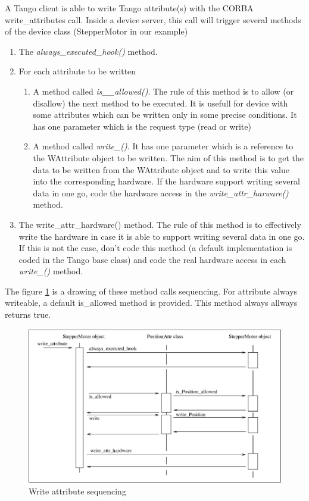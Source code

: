 A Tango client is able to write Tango attribute(s) with the CORBA
write\_attributes call. Inside a device server,
this call will trigger several methods of the device class (StepperMotor
in our example)
\begin{enumerate}
\item The \emph{always\_executed\_hook()}
method. 
\item For each attribute to be written

\begin{enumerate}
\item A method called \emph{is\_<att name>\_allowed()}. The rule of this
method is to allow (or disallow) the next method to be executed. It
is usefull for device with some attributes which can be written only
in some precise conditions. It has one parameter which is the request
type (read or write)
\item A method called \emph{write\_<att name>()}. It has one parameter which
is a reference to the WAttribute object to be written. The aim of
this method is to get the data to be written from the WAttribute object
and to write this value into the corresponding hardware. If the hardware
support writing several data in one go, code the hardware access in
the \emph{write\_attr\_harware()} method.
\end{enumerate}
\item The write\_attr\_hardware() method. The
rule of this method is to effectively write the hardware in case it
is able to support writing several data in one go. If this is not
the case, don't code this method (a default implementation is coded
in the Tango base class) and code the real hardware access in each
\emph{write\_<att name>()} method.
\end{enumerate}
The figure \ref{w_attribute_timing_fig} is a drawing of these method
calls sequencing. For attribute always writeable, a default is\_allowed
method is provided. This method always allways returns true.
\begin{figure}[H]
\begin{centering}
\includegraphics[scale=0.7]{ds_writing/w_attribute}
\par\end{centering}

\protect\caption{Write attribute sequencing\label{w_attribute_timing_fig}}
\end{figure}



